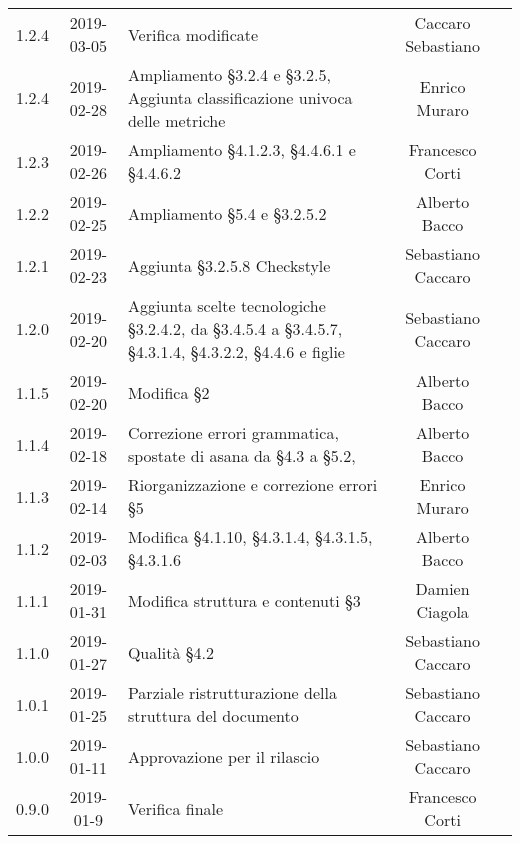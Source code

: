{\begin{longtable}{ c c C{4cm} c c }
		1.2.4 & 2019-03-05 & Verifica modificate & Caccaro Sebastiano & \ver{} \\		
		
		1.2.4 & 2019-02-28 & Ampliamento §3.2.4 e §3.2.5, Aggiunta classificazione univoca delle metriche & Enrico Muraro & \reda{} \\
		
		1.2.3 & 2019-02-26 & Ampliamento §4.1.2.3, §4.4.6.1 e §4.4.6.2 & Francesco Corti & \reda{} \\	
		
		1.2.2 & 2019-02-25 & Ampliamento §5.4 e §3.2.5.2 & Alberto Bacco & \reda{} \\
		
		1.2.1 & 2019-02-23 & Aggiunta §3.2.5.8 Checkstyle & Sebastiano Caccaro & \reda{} \\		
		
		1.2.0 & 2019-02-20 & Aggiunta scelte tecnologiche §3.2.4.2, da §3.4.5.4 a §3.4.5.7, §4.3.1.4, §4.3.2.2, §4.4.6 e figlie & Sebastiano Caccaro & \reda{} \\	
		
		1.1.5 & 2019-02-20 & Modifica §2 & Alberto Bacco & \reda{} \\
		
		1.1.4 & 2019-02-18 & Correzione errori grammatica, spostate di asana da §4.3 a §5.2, & Alberto Bacco & \reda{} \\
		
		1.1.3 & 2019-02-14 & Riorganizzazione e correzione errori §5 & Enrico Muraro & \reda{} \\
		
		1.1.2 & 2019-02-03 & Modifica §4.1.10, §4.3.1.4, §4.3.1.5, §4.3.1.6 & Alberto Bacco& \reda{} \\	
		
		1.1.1 & 2019-01-31 & Modifica struttura e contenuti §3 & Damien Ciagola & \reda{} \\	
		
		1.1.0 & 2019-01-27 & Qualità §4.2 & Sebastiano Caccaro & \reda{} \\	
		
		1.0.1 & 2019-01-25 & Parziale ristrutturazione della struttura del documento & Sebastiano Caccaro & \reda{} \\		
		
		1.0.0 & 2019-01-11 & Approvazione per il rilascio & Sebastiano Caccaro & \Res{} \\
		
		0.9.0 & 2019-01-9 & Verifica finale & Francesco Corti & \ver{} \\
		

\end{longtable}}
